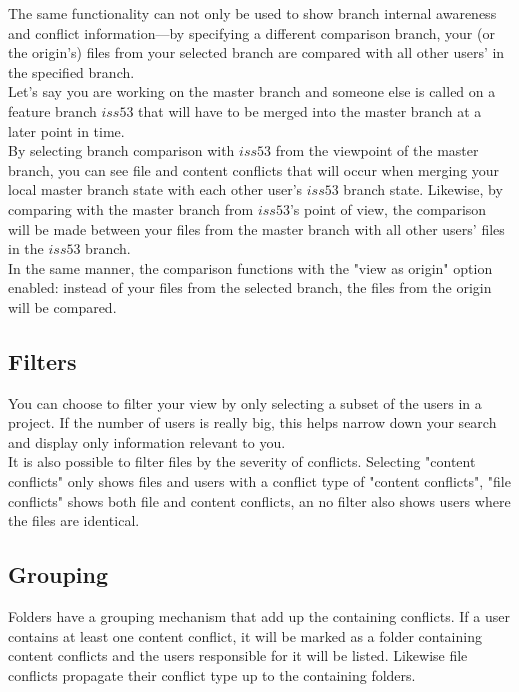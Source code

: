 The same functionality can not only be used to show branch internal awareness and conflict information---by specifying a different comparison branch, your (or the origin's) files from your selected branch are compared with all other users' in the specified branch. \\

Let's say you are working on the master branch and someone else is called on a feature branch $iss53$ that will have to be merged into the master branch at a later point in time. \\

By selecting branch comparison with $iss53$ from the viewpoint of the master branch, you can see file and content conflicts that will occur when merging your local master branch state with each other user's $iss53$ branch state. Likewise, by comparing with the master branch from $iss53$'s point of view, the comparison will be made between your files from the master branch with all other users' files in the $iss53$ branch. \\

In the same manner, the comparison functions with the "view as origin" option enabled: instead of your files from the selected branch, the files from the origin will be compared.

\subsection{Filters}

You can choose to filter your view by only selecting a subset of the users in a project. If the number of users is really big, this helps narrow down your search and display only information relevant to you. \\

It is also possible to filter files by the severity of conflicts. Selecting "content conflicts" only shows files and users with a conflict type of "content conflicts", "file conflicts" shows both file and content conflicts, an no filter also shows users where the files are identical.

\subsection{Grouping}

Folders have a grouping mechanism that add up the containing conflicts. If a user contains at least one content conflict, it will be marked as a folder containing content conflicts and the users responsible for it will be listed. Likewise file conflicts propagate their conflict type up to the containing folders.

